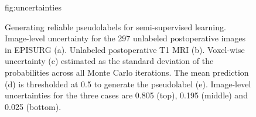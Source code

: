 \begin{figure}[ht!]
    \centering
    \floatconts
    {fig:uncertainties}
    {\caption{%
        Generating reliable pseudolabels for semi-supervised learning.
        Image-level uncertainty for the 297 unlabeled postoperative images in EPISURG (a).
        Unlabeled postoperative \ac{T1} \ac{MRI} (b).
        Voxel-wise uncertainty (c) estimated as the standard deviation of the probabilities across all Monte Carlo iterations.
        The mean prediction (d) is thresholded at 0.5 to generate the pseudolabel (e).
        Image-level uncertainties for the three cases are 0.805 (top), 0.195 (middle) and 0.025 (bottom).
    }}
    {
        }
\end{figure}
